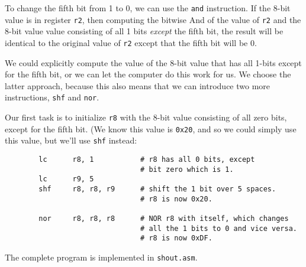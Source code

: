To change the fifth bit from 1 to 0, we can use the {\tt and}
instruction.  If the 8-bit value is in register {\tt r2}, then
computing the bitwise {\sc And} of the value of {\tt r2} and the 8-bit
value value consisting of all 1 bits {\em except} the fifth bit, the
result will be identical to the original value of {\tt r2} except that
the fifth bit will be 0.

We could explicitly compute the value of the 8-bit value that has all
1-bits except for the fifth bit, or we can let the computer do this
work for us.  We choose the latter approach, because this also means
that we can introduce two more instructions, {\tt shf} and {\tt nor}.

Our first task is to initialize {\tt r8} with the 8-bit value
consisting of all zero bits, except for the fifth bit.  (We know this
value is {\tt 0x20}, and so we could simply use this value, but we'll
use {\tt shf} instead:

\begin{verbatim}
        lc      r8, 1           # r8 has all 0 bits, except
                                # bit zero which is 1.
        lc      r9, 5
        shf     r8, r8, r9      # shift the 1 bit over 5 spaces.
                                # r8 is now 0x20.

        nor     r8, r8, r8      # NOR r8 with itself, which changes  
                                # all the 1 bits to 0 and vice versa.
                                # r8 is now 0xDF.
\end{verbatim}

The complete program is implemented in {\tt shout.asm}.





